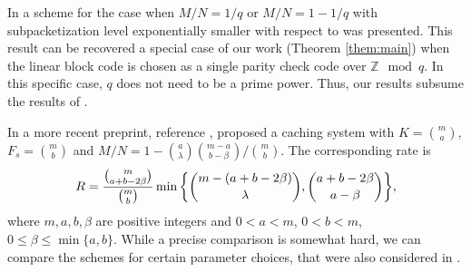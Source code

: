 \documentclass[journal,twocolumn]{IEEEtran}
\theoremstyle{definition}
\newtheorem{claim}{Claim}
\begin{document}
%



In \cite{yan_et_al17} a scheme for the case when $M/N = 1/q$ or $M/N = 1 - 1/q$ with subpacketization level exponentially smaller with respect to \cite{maddahN14} was presented. This result can be recovered a special case of
our work (Theorem \ref{them:main}) when the linear block code is chosen as a single parity check code over $\mathbb{Z} \mod q$. In this specific case, $q$ does not need to be a prime power. Thus, our results subsume the results of \cite{yan_et_al17}.

In a more recent preprint, reference \cite{yan2016placement}, proposed a caching system with $K =\binom{m}{a}$, $F_s=\binom{m}{b}$ and $M/N = 1 -\binom{a}{\lambda}\binom{m-a}{b-\beta}/ \binom{m}{b}$. The corresponding rate is %
$$R = \frac{\binom{m}{a+b-2\beta}}{\binom{m}{b}}\min \bigg{\{} \binom{m-(a+b-2\beta)}{\lambda},\binom{a+b-2\beta}{a-\beta} \bigg{\}},$$
where $m,a,b,\beta$ are positive integers and $0<a<m$, $0<b<m$, $0\le \beta \le \min\{a,b\}$. While a precise comparison is somewhat hard, we can compare the schemes for certain parameter choices, that were also considered in \cite{yan2016placement}.
\end{document}
